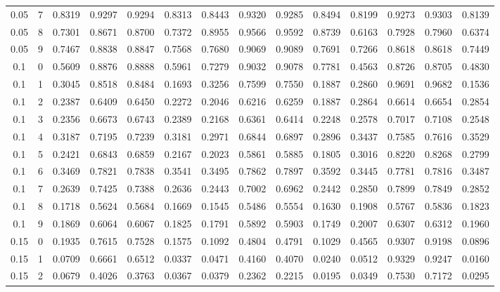 \documentclass[10pt, conference, a4paper, final]{IEEEtran}
\begin{document}
\begin{table}[ht]
{\begin{tabular}{cccccccccccccc}
        0.05 & 7 & 0.8319 & 0.9297 & 0.9294 & 0.8313 & 0.8443 & 0.9320 & 0.9285 & 0.8494 & 0.8199 & 0.9273 & 0.9303 & 0.8139 \\
        0.05 & 8 & 0.7301 & 0.8671 & 0.8700 & 0.7372 & 0.8955 & 0.9566 & 0.9592 & 0.8739 & 0.6163 & 0.7928 & 0.7960 & 0.6374 \\
        0.05 & 9 & 0.7467 & 0.8838 & 0.8847 & 0.7568 & 0.7680 & 0.9069 & 0.9089 & 0.7691 & 0.7266 & 0.8618 & 0.8618 & 0.7449 \\
        0.1 & 0 & 0.5609 & 0.8876 & 0.8888 & 0.5961 & 0.7279 & 0.9032 & 0.9078 & 0.7781 & 0.4563 & 0.8726 & 0.8705 & 0.4830 \\
        0.1 & 1 & 0.3045 & 0.8518 & 0.8484 & 0.1693 & 0.3256 & 0.7599 & 0.7550 & 0.1887 & 0.2860 & 0.9691 & 0.9682 & 0.1536 \\
        0.1 & 2 & 0.2387 & 0.6409 & 0.6450 & 0.2272 & 0.2046 & 0.6216 & 0.6259 & 0.1887 & 0.2864 & 0.6614 & 0.6654 & 0.2854 \\
        0.1 & 3 & 0.2356 & 0.6673 & 0.6743 & 0.2389 & 0.2168 & 0.6361 & 0.6414 & 0.2248 & 0.2578 & 0.7017 & 0.7108 & 0.2548 \\
        0.1 & 4 & 0.3187 & 0.7195 & 0.7239 & 0.3181 & 0.2971 & 0.6844 & 0.6897 & 0.2896 & 0.3437 & 0.7585 & 0.7616 & 0.3529 \\
        0.1 & 5 & 0.2421 & 0.6843 & 0.6859 & 0.2167 & 0.2023 & 0.5861 & 0.5885 & 0.1805 & 0.3016 & 0.8220 & 0.8268 & 0.2799 \\
        0.1 & 6 & 0.3469 & 0.7821 & 0.7838 & 0.3541 & 0.3495 & 0.7862 & 0.7897 & 0.3592 & 0.3445 & 0.7781 & 0.7816 & 0.3487 \\
        0.1 & 7 & 0.2639 & 0.7425 & 0.7388 & 0.2636 & 0.2443 & 0.7002 & 0.6962 & 0.2442 & 0.2850 & 0.7899 & 0.7849 & 0.2852 \\
        0.1 & 8 & 0.1718 & 0.5624 & 0.5684 & 0.1669 & 0.1545 & 0.5486 & 0.5554 & 0.1630 & 0.1908 & 0.5767 & 0.5836 & 0.1823 \\
        0.1 & 9 & 0.1869 & 0.6064 & 0.6067 & 0.1825 & 0.1791 & 0.5892 & 0.5903 & 0.1749 & 0.2007 & 0.6307 & 0.6312 & 0.1960 \\
        0.15 & 0 & 0.1935 & 0.7615 & 0.7528 & 0.1575 & 0.1092 & 0.4804 & 0.4791 & 0.1029 & 0.4565 & 0.9307 & 0.9198 & 0.0896 \\
        0.15 & 1 & 0.0709 & 0.6661 & 0.6512 & 0.0337 & 0.0471 & 0.4160 & 0.4070 & 0.0240 & 0.0512 & 0.9329 & 0.9247 & 0.0160 \\
        0.15 & 2 & 0.0679 & 0.4026 & 0.3763 & 0.0367 & 0.0379 & 0.2362 & 0.2215 & 0.0195 & 0.0349 & 0.7530 & 0.7172 & 0.0295 \\

\end{tabular}}
\end{table}
\end{document}
